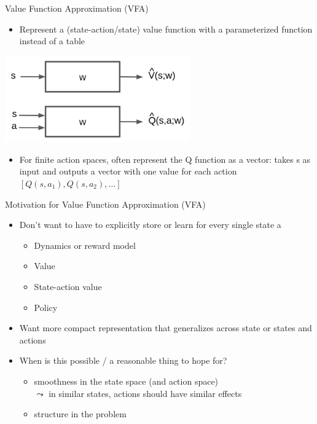 \documentclass[aspectratio=169]{../latex_main/tntbeamer}  %
\begin{document}
\begin{frame}[c]{Value Function Approximation (VFA)}
	
	
	\begin{itemize}
		\item Represent a (state-action/state) value function with a parameterized
		function instead of a table
	\end{itemize}
	
	\begin{center}
		\includegraphics[width=0.6\textwidth]{images/vfa.png}
	\end{center}

	\begin{itemize}
		\item For finite action spaces, often represent the Q function as a vector:
		takes s as input and outputs a vector with one value for each action
		$[Q(s,a_1), Q(s,a_2), \ldots]$
	\end{itemize}
	
\end{frame}
\begin{frame}[c]{Motivation for Value Function Approximation (VFA)}
	
	\begin{itemize}
		\item Don’t want to have to explicitly store or learn for every single state a
		\begin{itemize}
			\item Dynamics or reward model
			\item Value
			\item State-action value
			\item Policy
		\end{itemize}
		\pause
		\item Want more compact representation that generalizes across state or
		states and actions
		\pause
		\item When is this possible / a reasonable thing to hope for?
		\begin{itemize}
			\item smoothness in the state space (and action space)\\
			$\leadsto$ in similar states, actions should have similar effects 
			\item structure in the problem
		\end{itemize}
	\end{itemize}
	
\end{frame}
\end{document}

